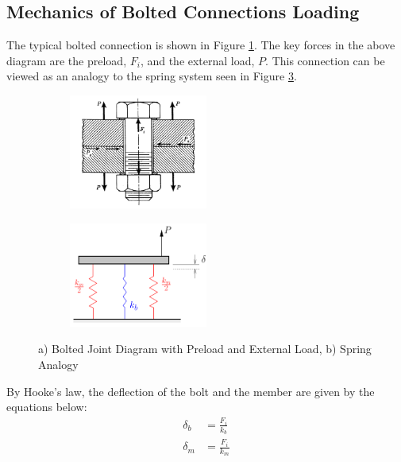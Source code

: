 \subsection{Mechanics of Bolted Connections Loading}
The typical bolted connection is shown in Figure \ref{fig:bolted_joint_diagram}. The key forces in the above diagram are the preload, $F_i$, and the external load, $P$. This connection can be viewed as an analogy to the spring system seen in Figure \ref{fig:spring_analogy}.
\begin{figure}[h]
    \centering
    \begin{subfigure}[b]{0.4\textwidth}
        \centering
        \includegraphics[width=0.5\textwidth]{Sections/Figures/bolted connection force diagram.png}
        \caption{}
        \label{fig:bolted_joint_diagram}
    \end{subfigure}
    \begin{subfigure}[b]{0.4\textwidth}
        \centering
        \includegraphics[width=0.5\textwidth]{Sections/Figures/spring analogy.png}
        \caption{}
        \label{fig:spring_analogy}
    \end{subfigure}
    \caption{a) Bolted Joint Diagram with Preload and External Load, b) Spring Analogy}
\end{figure}
By Hooke's law, the deflection of the bolt and the member are given by the equations below:
\begin{align}
    \delta_b &= \frac{F_i}{k_b} \label{eq:delta_b} \\
    \delta_m &= \frac{F_i}{k_m} \label{eq:delta_m}
\end{align}
